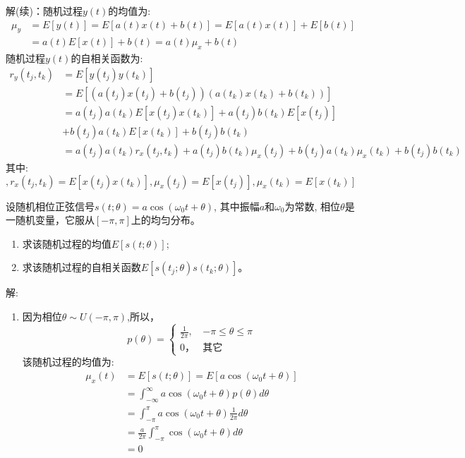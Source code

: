 \begin{frame}
解(续)：随机过程$y(t)$的均值为:
\begin{align*}
\mu_y&=E[y(t)]=E[a(t)x(t)+b(t)]=E[a(t)x(t)]+E[b(t)]\\
&=a(t)E[x(t)]+b(t)=a(t)\mu_x+b(t)
\end{align*}
随机过程$y(t)$的自相关函数为:
\begin{align*}
r_y(t_j,t_k)&=E[y(t_j)y(t_k)]\\
&=E[(a(t_j)x(t_j)+b(t_j))(a(t_k)x(t_k)+b(t_k))]\\
&=a(t_j)a(t_k)E[x(t_j)x(t_k)]+a(t_j)b(t_k)E[x(t_j)]\\
&+b(t_j)a(t_k)E[x(t_k)]+b(t_j)b(t_k)\\
&=a(t_j)a(t_k)r_x(t_j,t_k)+a(t_j)b(t_k)\mu_x(t_j)+b(t_j)a(t_k)\mu_x(t_k)+b(t_j)b(t_k)
\end{align*}
其中: $,r_x(t_j,t_k)=E[x(t_j)x(t_k)],\mu_x(t_j)=E[x(t_j)], \mu_x(t_k)=E[x(t_k)]$
\end{frame}

\begin{frame}
\begin{example}
	设随机相位正弦信号$s(t; \theta)=a\cos(\omega_0 t+\theta)$, 其中振幅$a$和$\omega_0$为常数, 相位$\theta$是一随机变量，它服从$[-\pi,\pi]$上的均匀分布。
	\begin{enumerate}
		\item 求该随机过程的均值$E[s(t; \theta)]$;
		\item 求该随机过程的自相关函数$E[s(t_j; \theta)s(t_k; \theta)]$。
	\end{enumerate}
\end{example}
\end{frame}

\begin{frame}
解:
\begin{enumerate}
\item 因为相位$\theta\sim U(-\pi,\pi)$,所以，
$$p(\theta)=\begin{cases}
\frac{1}{2\pi}, & -\pi\le\theta\le\pi\\
0， &\text{其它}
\end{cases} $$ 
该随机过程的均值为:
\begin{align*}
\mu_{x}(t)&=E[s(t; \theta)]=E[a\cos(\omega_0t+\theta)]\\
&=\int_{-\infty}^{\infty}a\cos(\omega_0t+\theta)p(\theta)d\theta\\
&=\int_{-\pi}^{\pi}a\cos(\omega_0t+\theta)\frac{1}{2\pi}d\theta\\
&=\frac{a}{2\pi}\int_{-\pi}^{\pi}\cos(\omega_0t+\theta)d\theta\\
&=0
\end{align*}
\end{enumerate}
\end{frame}

